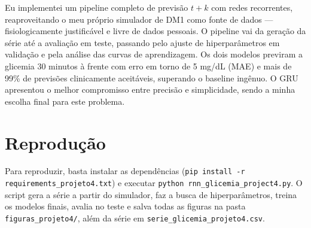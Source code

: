 \documentclass[11pt,a4paper]{article}
\begin{document}
Eu implementei um pipeline completo de previsão $t+k$ com redes recorrentes,
reaproveitando o meu próprio simulador de DM1 como fonte de dados ---
fisiologicamente justificável e livre de dados pessoais. O pipeline vai da
geração da série até a avaliação em teste, passando pelo ajuste de
hiperparâmetros em validação e pela análise das curvas de aprendizagem. Os dois
modelos previram a glicemia 30 minutos à frente com erro em torno de 5 mg/dL
(MAE) e mais de 99\% de previsões clinicamente aceitáveis, superando o baseline
ingênuo. O GRU apresentou o melhor compromisso entre precisão e simplicidade,
sendo a minha escolha final para este problema.

\section*{Reprodução}

Para reproduzir, basta instalar as dependências
(\texttt{pip install -r requirements\_projeto4.txt}) e executar
\texttt{python rnn\_glicemia\_project4.py}. O script gera a série a partir do
simulador, faz a busca de hiperparâmetros, treina os modelos finais, avalia no
teste e salva todas as figuras na pasta \texttt{figuras\_projeto4/}, além da
série em \texttt{serie\_glicemia\_projeto4.csv}.
\end{document}
